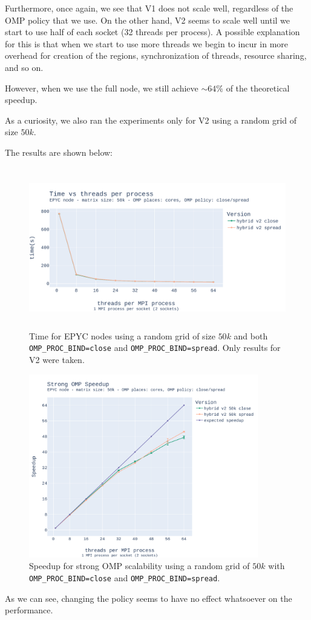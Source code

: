 \documentclass{report}
\begin{document}
Furthermore, once again, we see that V1 does not scale well, regardless of the 
OMP policy that we use. On the other hand, V2 seems to scale well until 
we start to use half of each socket (32 threads per process). A possible 
explanation for this is that when we start to use more threads we begin to 
incur in more overhead for creation of the regions, synchronization of threads, 
resource sharing, and so on. 

However, when we use the full node, we still achieve $\sim 64\%$ of the 
theoretical speedup.

As a curiosity, we also ran the experiments only for V2 using a random grid 
of size $50k$. 

The results are shown below:

\begin{figure}[H]
\centering
\includegraphics[width=14cm, height=7cm]{./images/strong_OMP_epyc_hybrid_grid_050k.pdf}
\caption{\label{fig:strongomp10kepyc} Time for EPYC nodes using a random grid of size 
$50k$ and both \texttt{OMP\_PROC\_BIND=close} and \texttt{OMP\_PROC\_BIND=spread}. 
Only results for V2 were taken.}
\end{figure}

\begin{figure}[H]
\centering
\includegraphics[width=10cm, height=8cm]{./images/strong_OMP_epyc_hybrid_grid_050k_speedup.pdf}
\caption{\label{fig:strongomp10kspeedupepyc}Speedup for strong OMP scalability using a random 
grid of $50k$ with \texttt{OMP\_PROC\_BIND=close} and \texttt{OMP\_PROC\_BIND=spread}. }
\end{figure}
As we can see, changing the policy seems to have no effect whatsoever on the 
performance. 
\end{document}
